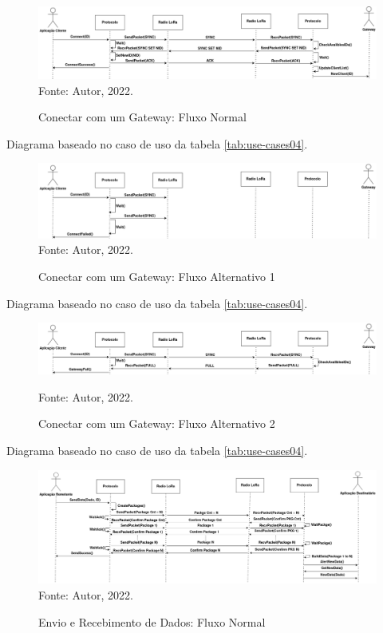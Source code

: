 \begin{figure}[htp]
    \centering
	\caption{Conectar com um Gateway: Fluxo Normal}
    \includegraphics[width=\textwidth,height=0.18\textheight]{img/connect.drawio.png}
    \label{fig:sq-connect}
    Fonte: Autor, 2022.
\end{figure}

Diagrama baseado no caso de uso da tabela \ref{tab:use-cases04}.

\begin{figure}[htp]
    \centering
	\caption{Conectar com um Gateway: Fluxo Alternativo 1}
    \includegraphics[width=\textwidth,height=0.14\textheight]{img/connect-fa2.drawio.png}
    \label{fig:sq-connect-fa}
    Fonte: Autor, 2022.
\end{figure}

Diagrama baseado no caso de uso da tabela \ref{tab:use-cases04}.
\newpage

\begin{figure}[htp]
    \centering
	\caption{Conectar com um Gateway: Fluxo Alternativo 2}
    \includegraphics[width=\textwidth,height=0.09\textheight]{img/connect-fa.drawio.png}
    \label{fig:sq-connect-fa2}
    
    Fonte: Autor, 2022.
\end{figure}

Diagrama baseado no caso de uso da tabela \ref{tab:use-cases04}.

\begin{figure}[htp]
    \centering
	\caption{Envio e Recebimento de Dados: Fluxo Normal}
    \includegraphics[width=\textwidth,height=0.27\textheight]{img/data.drawio.png}
    \label{fig:sq-data}
    Fonte: Autor, 2022.
\end{figure}

